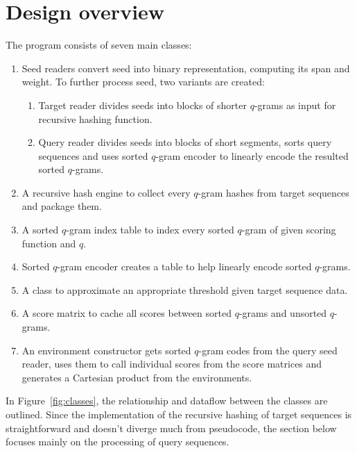 \documentclass[twoside,a4paper,bsc]{master}
\newcommand{\Qgram}[1]{\(#1\)-gram}
\begin{document}
\section{Design overview}
The program consists of seven main classes:
\begin{enumerate}
\item Seed readers convert seed into binary representation, computing its
span and weight. To further process seed, two variants are created:
\begin{enumerate}
\item Target reader divides seeds into blocks of shorter \Qgram{q}s as
input for recursive hashing function.
\item Query reader divides seeds into blocks of short segments, sorts query
sequences and uses sorted \Qgram{q} encoder to linearly encode the
resulted sorted \Qgram{q}s.
\end{enumerate}
\item A recursive hash engine to collect every \Qgram{q} hashes from
target sequences and package them.
\item A sorted \Qgram{q} index table to index every sorted \Qgram{q} of
given
scoring function and \(q\).
\item Sorted \Qgram{q} encoder creates a table to help linearly encode
sorted \Qgram{q}s.
\item A class to approximate an appropriate threshold given target sequence
data.
\item A score matrix to cache all scores between sorted \Qgram{q}s and
unsorted \Qgram{q}s.
\item An environment constructor gets sorted \Qgram{q} codes from the
query seed reader, uses them to call individual scores from the score
matrices and generates a Cartesian product from the environments.
\end{enumerate}
In Figure~\ref{fig:classes}, the relationship and dataflow between the
classes are outlined. Since the implementation of the recursive hashing of
target sequences is straightforward and doesn't diverge much from
pseudocode, the section below focuses mainly on the processing of query
sequences.
\end{document}
